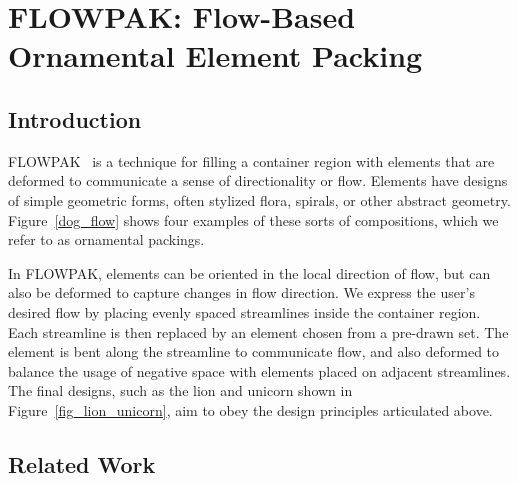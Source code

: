 \chapter
{FLOWPAK: Flow-Based Ornamental Element Packing}
\label{chapter_flowpak}








\section{Introduction}
\label{flowpak_introduction}





\nnewtext
{
FLOWPAK~\cite{Saputra2017} is a technique for filling a container 
region with elements that are deformed 
to communicate a sense of directionality or flow.
Elements have designs of simple geometric forms, often stylized flora, spirals, or other abstract geometry. 
Figure~\ref{dog_flow} shows four examples of these sorts of compositions, which we refer to as ornamental packings.
}

In FLOWPAK, elements can be oriented in the local direction 
of flow, but can also be deformed to capture changes in flow direction.
We express the user's desired flow by placing evenly spaced streamlines
inside the container region.  Each streamline is then replaced by an
element chosen from a pre-drawn set.  The element is bent along the streamline
to communicate flow, and also deformed to balance the usage of negative space
with elements placed on adjacent streamlines.  The final designs, such
as the lion and unicorn shown in Figure~\ref{fig_lion_unicorn}, aim to obey the
design principles articulated above.




\section{Related Work}
\label{flowpak_previous_work}



